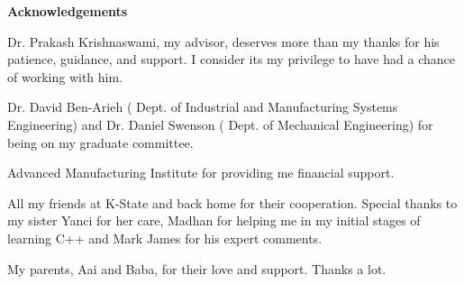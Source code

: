 \begin{center}
{\huge \bf {Acknowledgements}}
\end{center}
\vspace{0.15in}


    Dr. Prakash Krishnaswami, my advisor, deserves more than my thanks for his
    patience, guidance, and support. I consider its my privilege to have had
    a chance of working with him.

    Dr. David Ben-Arieh ( Dept. of Industrial and Manufacturing Systems
    Engineering) and Dr. Daniel Swenson ( Dept. of Mechanical Engineering)
    for being on my graduate committee.

    Advanced Manufacturing Institute for providing me financial support.

    All my friends at K-State and back home for their cooperation.
	Special thanks to my sister Yanci for her care, Madhan for 
	helping me in my initial
    stages of learning C++ and Mark James for his expert comments.

    My parents, Aai and Baba, for their love and support. Thanks a lot.

